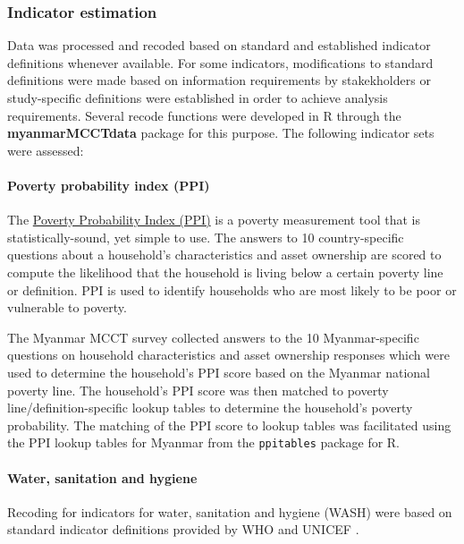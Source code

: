 \documentclass[12pt,a4paper]{article}
\let\oldparagraph\paragraph
\renewcommand{\paragraph}[1]{\oldparagraph{#1}\mbox{}}
\begin{document}
\hypertarget{indicator-estimation}{%
\subsubsection{Indicator estimation}\label{indicator-estimation}}

Data was processed and recoded based on standard and established indicator definitions whenever available. For some indicators, modifications to standard definitions were made based on information requirements by stakekholders or study-specific definitions were established in order to achieve analysis requirements. Several recode functions were developed in R through the \textbf{myanmarMCCTdata} package for this purpose. The following indicator sets were assessed:

\hypertarget{ppi}{%
\paragraph{Poverty probability index (PPI)}\label{ppi}}

The \href{https://www.povertyindex.org}{Poverty Probability Index (PPI)} is a poverty measurement tool that is statistically-sound, yet simple to use. The answers to 10 country-specific questions about a household's characteristics and asset ownership are scored to compute the likelihood that the household is living below a certain poverty line or definition\citep{InnovationsforPovertyAction2019}. PPI is used to identify households who are most likely to be poor or vulnerable to poverty.

The Myanmar MCCT survey collected answers to the 10 Myanmar-specific questions on household characteristics and asset ownership responses which were used to determine the household's PPI score based on the Myanmar national poverty line. The household's PPI score was then matched to poverty line/definition-specific lookup tables to determine the household's poverty probability. The matching of the PPI score to lookup tables was facilitated using the PPI lookup tables for Myanmar from the \texttt{ppitables} package \citep{Guevarra2019} for R.

\hypertarget{wash}{%
\paragraph{Water, sanitation and hygiene}\label{wash}}

Recoding for indicators for water, sanitation and hygiene (WASH) were based on standard indicator definitions provided by WHO and UNICEF \citep{WHOUNICEFJointMonitoringProgrammeforWaterSupplyandSanitation:2018vr, WorldHealthOrganization:2006vv}.
\end{document}
